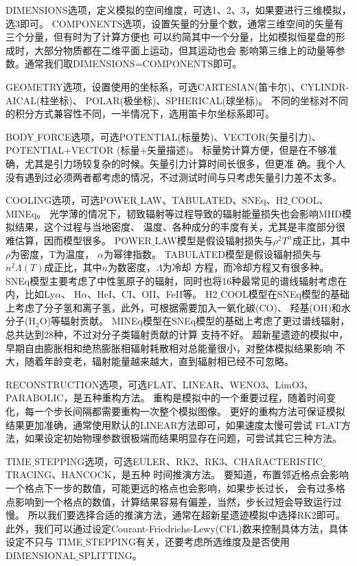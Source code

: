 DIMENSIONS选项，定义模拟的空间维度，可选1、2、3，如果要进行三维模拟，选3即可。
COMPONENTS选项，设置矢量的分量个数，通常三维空间的矢量有三个分量，但有时为了计算方便也
可以约简其中一个分量，比如模拟恒星盘的形成时，大部分物质都在二维平面上运动，但其运动也会
影响第三维上的动量等参数。通常我们取DIMENSIONS=COMPONENTS即可。

GEOMETRY选项，设置使用的坐标系，可选CARTESIAN(笛卡尔)、CYLINDR- AICAL(柱坐标)、
POLAR(极坐标)、SPHERICAL(球坐标)。
不同的坐标对不同的积分方式兼容性不同，一半情况下，选用笛卡尔坐标系即可。

BODY$\_$FORCE选项，可选POTENTIAL(标量势)、VECTOR(矢量引力)、POTENTIAL+VECTOR
(标量+矢量描述)。
标量势计算方便，但是在不够准确，尤其是引力场较复杂的时候。矢量引力计算时间长很多，但更准
确。我个人没有遇到过必须两者都考虑的情况，不过测试时间与只考虑矢量引力差不太多。

COOLING选项，可选POWER$\_$LAW、TABULATED、SNEq、H2$\_$COOL、MINEq。
光学薄的情况下，韧致辐射等过程导致的辐射能量损失也会影响MHD模拟结果，这个过程与当地密度、
温度、各种成分的丰度有关，尤其是丰度部分很难估算，因而模型很多。
POWER$\_$LAW模型是假设辐射损失与$\rho^2T^{\alpha}$成正比，其中$\rho$为密度，T为温度，
$\alpha$为幂律指数。
TABULATED模型是假设辐射损失与$n^2\Lambda(T)$成正比，其中$n$为数密度，$\Lambda$为冷却
方程，而冷却方程又有很多种\citep{2017RMxAA..53..385F}。
SNEq模型主要考虑了中性氢原子的辐射，同时也将16种最常见的谱线辐射考虑在内，比如Ly$\alpha$、
H$\alpha$、HeI、CI、OII、FeII等。
H2$\_$COOL模型在SNEq模型的基础上考虑了分子氢和离子氢，此外，可根据需要加入一氧化碳(CO)、
羟基(OH)和水分子(H$_2$O)等辐射贡献。
MINEq模型在SNEq模型的基础上考虑了更过谱线辐射，总共达到28种，不过对分子类辐射贡献的计算
支持不好。
超新星遗迹的模拟中，早期自由膨胀相和绝热膨胀相辐射耗散相对总能量很小，对整体模拟结果影响
不大，随着年龄变老，辐射能量越来越大，直到辐射相已经不可忽略。

RECONSTRUCTION选项，可选FLAT、LINEAR、WENO3、LimO3、PARABOLIC，是五种重构方法。
重构是模拟中的一个重要过程，随着时间变化，每一个步长间隔都需要重构一次整个模拟图像。
更好的重构方法可保证模拟结果更加准确，通常使用默认的LINEAR方法即可，如果速度太慢可尝试
FLAT方法，如果设定初始物理参数很极端而结果明显存在问题，可尝试其它三种方法。

TIME$\_$STEPPING选项，可选EULER、RK2、RK3、CHARACTERISTIC$\_$TRACING、HANCOCK，是五种
时间推演方法。
要知道，布置邻近格点会影响一个格点下一步的数值，可能更远的格点也会影响，如果步长过长，
会有过多格点影响到一个格点的数值，计算结果容易有偏差，当然，步长过短会导致运行过慢。
所以我们要选择合适的推演方法，通常在超新星遗迹模拟中选择RK2即可。
此外，我们可以通过设定Courant-Friedrichs-Lewy(CFL)数来控制具体方法，具体设定不只与
TIME$\_$STEPPING有关，还要考虑所选维度及是否使用DIMENSIONAL$\_$SPLITTING。

